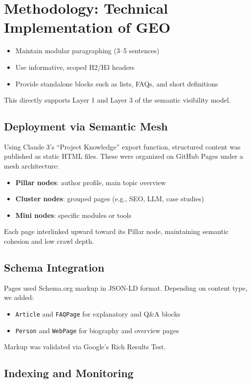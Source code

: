 \section{Methodology: Technical Implementation of GEO}


\begin{itemize}
  \item Maintain modular paragraphing (3--5 sentences)
  \item Use informative, scoped H2/H3 headers
  \item Provide standalone blocks such as lists, FAQs, and short definitions
\end{itemize}
This directly supports Layer 1 and Layer 3 of the semantic visibility model.

\subsection{Deployment via Semantic Mesh}

Using Claude 3’s “Project Knowledge” export function, structured content was published as static HTML files. These were organized on GitHub Pages under a mesh architecture:
\begin{itemize}
  \item \textbf{Pillar nodes}: author profile, main topic overview
  \item \textbf{Cluster nodes}: grouped pages (e.g., SEO, LLM, case studies)
  \item \textbf{Mini nodes}: specific modules or tools
\end{itemize}
Each page interlinked upward toward its Pillar node, maintaining semantic cohesion and low crawl depth.

\subsection{Schema Integration}

Pages used Schema.org markup in JSON-LD format. Depending on content type, we added:
\begin{itemize}
  \item \texttt{Article} and \texttt{FAQPage} for explanatory and Q\&A blocks
  \item \texttt{Person} and \texttt{WebPage} for biography and overview pages
\end{itemize}
Markup was validated via Google’s Rich Results Test.

\subsection{Indexing and Monitoring}

